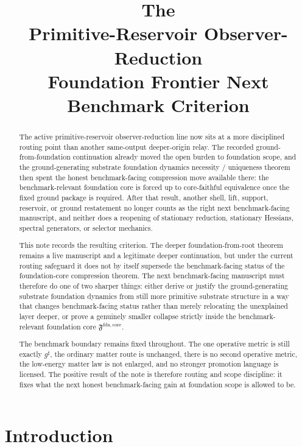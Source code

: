 \documentclass[11pt]{article}
\title{\textbf{The \TheoryName{}}\\[0.4em]
\large Primitive-Reservoir Observer-Reduction\\
\large Foundation Frontier Next Benchmark Criterion}
\author{}
\date{}
\newcommand{\CompletedMetric}{g^{\sharp}}
\newcommand{\FoundationCore}{\mathfrak F^{\mathrm{fdn,core}}}
\begin{document}
\maketitle

\begin{abstract}
The active primitive-reservoir observer-reduction line now sits at a more disciplined routing point than another same-output deeper-origin relay. The recorded ground-from-foundation continuation already moved the open burden to foundation scope, and the ground-generating substrate foundation dynamics necessity / uniqueness theorem then spent the honest benchmark-facing compression move available there: the benchmark-relevant foundation core is forced up to core-faithful equivalence once the fixed ground package is required. After that result, another shell, lift, support, reservoir, or ground restatement no longer counts as the right next benchmark-facing manuscript, and neither does a reopening of stationary reduction, stationary Hessians, spectral generators, or selector mechanics.

This note records the resulting criterion. The deeper foundation-from-root theorem remains a live manuscript and a legitimate deeper continuation, but under the current routing safeguard it does not by itself supersede the benchmark-facing status of the foundation-core compression theorem. The next benchmark-facing manuscript must therefore do one of two sharper things: either derive or justify the ground-generating substrate foundation dynamics from still more primitive substrate structure in a way that changes benchmark-facing status rather than merely relocating the unexplained layer deeper, or prove a genuinely smaller collapse strictly inside the benchmark-relevant foundation core \(\FoundationCore\).

The benchmark boundary remains fixed throughout. The one operative metric is still exactly \(\CompletedMetric\), the ordinary matter route is unchanged, there is no second operative metric, the low-energy matter law is not enlarged, and no stronger promotion language is licensed. The positive result of the note is therefore routing and scope discipline: it fixes what the next honest benchmark-facing gain at foundation scope is allowed to be.
\end{abstract}

\section{Introduction}
\end{document}
